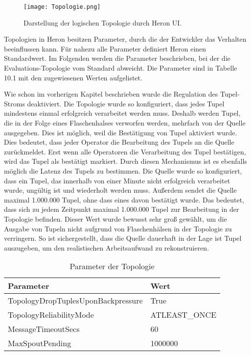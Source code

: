 \begin{figure}
\texttt{[image: Topologie.png]}
\caption{Darstellung der logischen Topologie durch Heron UI.}
\end{figure}

Topologien in Heron besitzen Parameter, durch die der Entwickler das Verhalten beeinflussen kann.
Für nahezu alle Parameter definiert Heron einen Standardwert.
Im Folgenden werden die Parameter beschrieben, bei der die Evaluations-Topologie vom Standard abweicht.
Die Parameter sind in Tabelle 10.1 mit den zugewiesenen Werten aufgelistet.

Wie schon im vorherigen Kapitel beschrieben wurde die Regulation des Tupel-Stroms deaktiviert.
Die Topologie wurde so konfiguriert, dass jedes Tupel mindestens einmal erfolgreich verarbeitet werden muss.
Deshalb werden Tupel, die in der Folge eines Flaschenhalses verworfen werden, mehrfach von der Quelle ausgegeben.
Dies ist möglich, weil die Bestätigung von Tupel aktiviert wurde.
Dies bedeutet, dass jeder Operator die Bearbeitung des Tupels an die Quelle zurückmeldet.
Erst wenn alle Operatoren die Verarbeitung des Tupel bestätigen, wird das Tupel als bestätigt markiert.
Durch diesen Mechanismus ist es ebenfalls möglich die Latenz des Tupels zu bestimmen.
Die Quelle wurde so konfiguriert, dass ein Tupel, das innerhalb von einer Minute nicht erfolgreich verarbeitet wurde, ungültig ist und wiederholt werden muss.
Außerdem sendet die Quelle maximal 1.000.000 Tupel, ohne dass eines davon bestätigt wurde.
Das bedeutet, dass sich zu jedem Zeitpunkt maximal 1.000.000 Tupel zur Bearbeitung in der Topologie befinden.
Dieser Wert wurde bewusst sehr groß gewählt, um die Ausgabe von Tupeln nicht aufgrund von Flaschenhälsen in der Topologie zu verringern.
So ist sichergestellt, dass die Quelle dauerhaft in der Lage ist Tupel auszugeben, um den realistischen Arbeitsaufwand zu rekonstruieren.

\begin{table}
\caption{Parameter der Topologie}
\begin{tabular}{ll}
\hline
\textbf{Parameter} & \textbf{Wert} \\ \hline
TopologyDropTuplesUponBackpressure & True \\
TopologyReliabilityMode & ATLEAST\_ONCE \\
MessageTimeoutSecs & 60 \\
MaxSpoutPending & 1000000 \\
\hline
\end{tabular}
\end{table}


